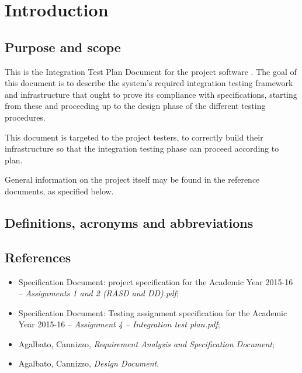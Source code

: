 \chapter{Introduction}

\section{Purpose and scope}
This is the Integration Test Plan Document for the project software \mts{}. The goal of this document is to describe the system's required integration testing framework and infrastructure that ought to prove its compliance with specifications, starting from these and proceeding up to the design phase of the different testing procedures.

This document is targeted to the project testers, to correctly build their infrastructure so that the integration testing phase can proceed according to plan.

General information on the \mts{} project itself may be found in the reference documents, as specified below.

\section{Definitions, acronyms and abbreviations}


\section{References}
\begin{itemize}
\item Specification Document: \mts{} project specification for the Academic Year 2015-16 -- \emph{Assignments 1 and 2 (RASD and DD).pdf};
\item Specification Document: Testing assignment specification for the Academic Year 2015-16 -- \emph{Assignment 4 -- Integration test plan.pdf};
\item Agalbato, Cannizzo, \emph{Requirement Analysis and Specification Document};
\item Agalbato, Cannizzo, \emph{Design Document}.
\end{itemize}